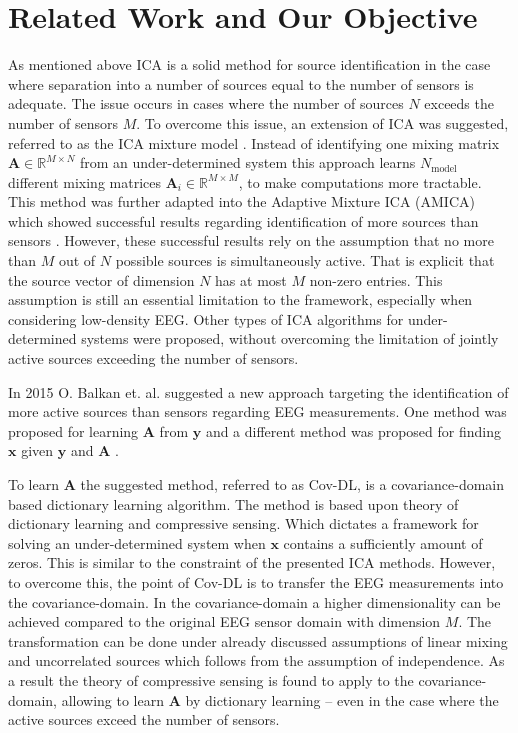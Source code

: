 \section{Related Work and Our Objective}\label{sec:relatedwork}
As mentioned above ICA is a solid method for source identification in the case where separation into a number of sources equal to the number of sensors is adequate. The issue occurs in cases where the number of sources $N$ exceeds the number of sensors $M$. 
To overcome this issue, an extension of ICA was suggested, referred to as the ICA mixture model \cite{Balkan2015}.
Instead of identifying one mixing matrix $\mathbf{A} \in \mathbb{R}^{M \times N}$ from an under-determined system this approach learns $N_{\text{model}}$ different mixing matrices $\mathbf{A}_i \in \mathbb{R}^{M\times M}$, to make computations more tractable. 
This method was further adapted into the Adaptive Mixture ICA (AMICA) which showed successful results regarding identification of more sources than sensors \cite{Palmer2008}. 
However, these successful results rely on the assumption that no more than $M$ out of $N$ possible sources is simultaneously active. That is explicit that the source vector of dimension $N$ has at most $M$ non-zero entries.
This assumption is still an essential limitation to the framework, especially when considering low-density EEG. 
Other types of ICA algorithms for under-determined systems were proposed, without overcoming the limitation of jointly active sources exceeding the number of sensors.

In 2015 O. Balkan et. al. suggested a new approach targeting the identification of more active sources than sensors regarding EEG measurements. One method was proposed for learning $\textbf{A}$ from $\textbf{y}$ \cite{Balkan2015} and a different method was proposed for finding $\textbf{x}$ given $\textbf{y}$ and $\textbf{A}$ \cite{Balkan2014}.

To learn $\textbf{A}$ the suggested method, referred to as Cov-DL, is a covariance-domain based dictionary learning algorithm. 
The method is based upon theory of dictionary learning and compressive sensing. Which dictates a framework for solving an under-determined system when $\textbf{x}$ contains a sufficiently amount of zeros. 
This is similar to the constraint of the presented ICA methods. However, to overcome this, the point of Cov-DL is to transfer the EEG measurements into the covariance-domain. In the covariance-domain a higher dimensionality can be achieved compared to the original EEG sensor domain with dimension $M$.
The transformation can be done under already discussed assumptions  of linear mixing and uncorrelated sources which follows from the assumption of independence.
As a result the theory of compressive sensing is found to apply to the covariance-domain, allowing to learn $\textbf{A}$ by dictionary learning -- even in the case where the active sources exceed the number of sensors.

